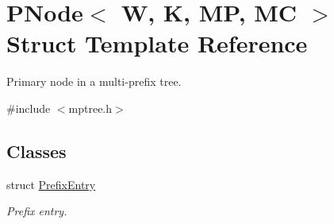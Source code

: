 \hypertarget{structPNode}{\section{P\-Node$<$ W, K, M\-P, M\-C $>$ Struct Template Reference}
\label{structPNode}
}


Primary node in a multi-\/prefix tree.  




{\ttfamily \#include $<$mptree.\-h$>$}

\subsection*{Classes}
\begin{DoxyCompactItemize}
\item 
struct \hyperlink{structPNode_1_1PrefixEntry}{Prefix\-Entry}
\begin{DoxyCompactList}\small\item\em Prefix entry. \end{DoxyCompactList}\end{DoxyCompactItemize}
